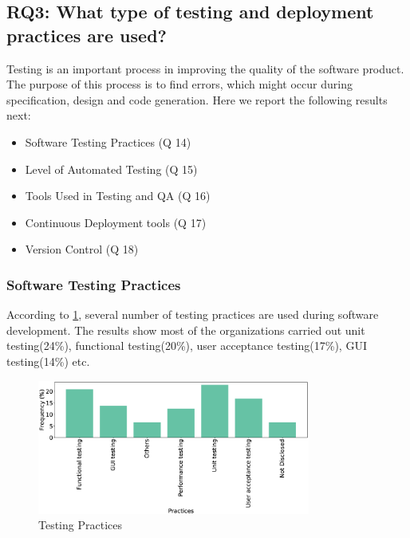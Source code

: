 \subsection{RQ3: What type of testing and deployment practices are used?}
\label{RQ3}
Testing is an important process in improving the quality of the software product. The purpose of this process is to find errors, which might occur during specification, design and code generation. Here we report the following results next:
\begin{itemize}
\item Software Testing Practices (Q 14)
\item Level of Automated Testing (Q 15)
\item Tools Used in Testing and QA (Q 16)
\item Continuous Deployment tools (Q 17)
\item Version Control (Q 18)
\end{itemize}

\subsubsection{Software Testing Practices}
According to \cref{fig:testing}, several number of testing practices are used during software development. The results show most of the organizations carried out unit testing(24\%), functional testing(20\%), user acceptance testing(17\%), GUI testing(14\%) etc.
\begin{figure}[]
\centering
  \includegraphics[width=0.8\textwidth]{Figures/Respondents_testing_practices}
  \caption{Testing Practices}
  \label{fig:testing}
\end{figure}

